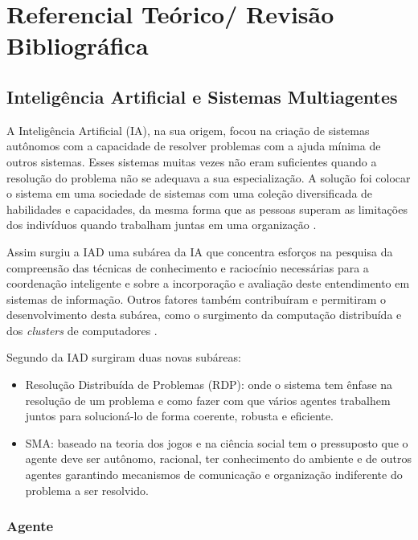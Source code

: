\chapter{Referencial Teórico/ Revisão Bibliográfica}

\section{Inteligência Artificial e Sistemas Multiagentes}

A Inteligência Artificial (IA), na sua origem, focou na criação de sistemas autônomos com a capacidade de resolver problemas com a ajuda mínima de outros sistemas. Esses sistemas muitas vezes não eram suficientes quando a resolução do problema não se adequava a sua especialização. A solução foi colocar o sistema em uma sociedade de sistemas com uma coleção diversificada de habilidades e capacidades, da mesma forma que as pessoas superam as limitações dos indivíduos quando trabalham juntas em uma organização \cite{durfee1991distributed}. 

Assim surgiu a IAD uma subárea da IA que concentra esforços na pesquisa da compreensão das técnicas de conhecimento e raciocínio necessárias para a coordenação inteligente e sobre a incorporação e avaliação deste entendimento em sistemas de informação. Outros fatores também contribuíram e permitiram o desenvolvimento desta subárea, como o surgimento da computação distribuída e dos \textit{clusters} de computadores \cite{durfee1991distributed,bond2014readings}.

Segundo \cite{durfee1994distributed} da IAD surgiram duas novas subáreas:

\begin{itemize}
\item Resolução Distribuída de Problemas (RDP): onde o sistema tem ênfase na resolução de um problema e como fazer com que vários agentes trabalhem juntos para solucioná-lo de forma coerente, robusta e eficiente.

\item SMA: baseado na teoria dos jogos e na ciência social tem o pressuposto que o agente deve ser autônomo, racional, ter conhecimento do ambiente e de outros agentes garantindo mecanismos de comunicação e organização indiferente do problema a ser resolvido.
\end{itemize}

\subsection{Agente}

